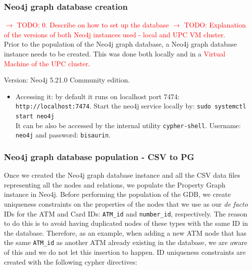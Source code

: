 \documentclass{article}
\begin{document}

\subsubsection{Neo4j graph database creation}
\textcolor{red}{$\rightarrow$ TODO: 0. Describe on how to set up the database}
\textcolor{red}{$\rightarrow$ TODO: Explanation of the versions of both Neo4j instances used - local and UPC VM cluster.}\\

Prior to the population of the Neo4j graph database, a Neo4j graph database instance needs to be
created. This was done both locally and in a \textcolor{red}{Virtual Machine of the UPC cluster}.

Version: Neo4j 5.21.0 Community edition. 
\begin{itemize}
    \item Accessing it: by default it runs on localhost port 7474: \texttt{http://localhost:7474}.
    Start the neo4j service locally by: \texttt{sudo systemctl start neo4j}\\
    It can be also be accessed by the internal utility \texttt{cypher-shell}. Username: \texttt{neo4j} and password: \texttt{bisaurin}.
\end{itemize}

\subsubsection{Neo4j graph database population - CSV to PG}

Once we created the Neo4j graph database instance and all the CSV data files representing all the nodes and relations, we populate the Property Graph instance in Neo4j. Before performing the population of the GDB, we create uniqueness constraints on the properties of the nodes that we use as our \emph{de facto} IDs for the ATM and Card IDs: \texttt{ATM\_id} and \texttt{number\_id}, respectively. The reason to do this is to avoid having duplicated nodes of these types with the same ID in the database. Therefore, as an example, when adding a new ATM node that has the same \texttt{ATM\_id} as another ATM already existing in the database, we are aware of this and we do not let this insertion to happen. ID uniqueness constraints are created with the following cypher directives:
\end{document}
